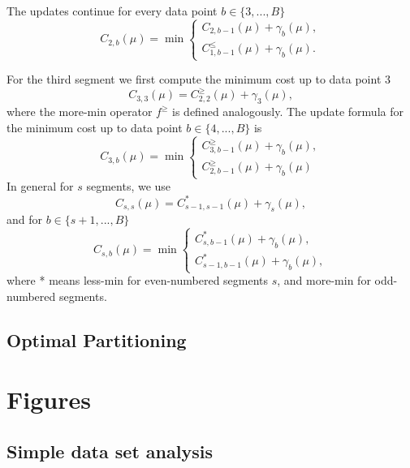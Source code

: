 \documentclass{article}
\begin{document}
The updates continue for every data point $b\in\{3, ..., B\}$
\begin{equation*}
  C_{2,b}(\mu) = \min
  \begin{cases}
    C_{2,b-1}(\mu) + \gamma_b(\mu),\\
    C_{1,b-1}^{\leq}(\mu) + \gamma_b(\mu).
  \end{cases}
\end{equation*}

For the third segment we first compute the minimum cost up to data point 3
\begin{equation*}
  C_{3,3}(\mu) = C_{2,2}^{\geq}(\mu) + \gamma_3(\mu),
\end{equation*}
where the more-min operator $f^\geq$ is defined analogously. The
update formula for the minimum cost up to data point
$b\in\{4, ..., B\}$ is
\begin{equation*}
  C_{3,b}(\mu) = \min
  \begin{cases}
    C_{3,b-1}^{\geq}(\mu)+\gamma_b(\mu),\\
    C_{2,b-1}^{\geq}(\mu)+\gamma_b(\mu)
  \end{cases}
\end{equation*}
In general for $s$ segments, we use
\begin{equation}
  C_{s,s}(\mu) = C_{s-1,s-1}^{*}(\mu) + \gamma_s(\mu),
\end{equation}
and for $b\in\{s+1, ..., B\}$
\begin{equation}
  C_{s,b}(\mu) = \min
  \begin{cases}
    C_{s,b-1}^{*}(\mu)+\gamma_b(\mu),\\
    C_{s-1,b-1}^{*}(\mu)+\gamma_b(\mu),
  \end{cases}
\end{equation}
where * means less-min for even-numbered segments $s$, and more-min
for odd-numbered segments.

\subsection{Optimal Partitioning}

\section{Figures}

\subsection{Simple data set analysis}
\end{document}
